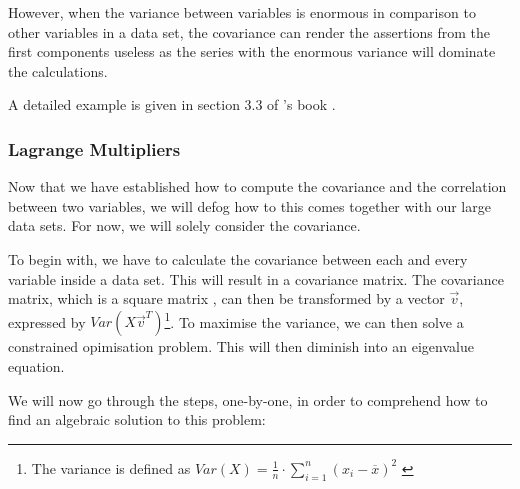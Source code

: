 However, when the variance between variables is enormous in comparison to other variables in a data set, the covariance can render the assertions from the first components useless as the series with the enormous variance will dominate the calculations.

A detailed example is given in section 3.3 of \citeauthor{brunton2019data}'s book  \cite{brunton2019data}.


\clearpage



\subsubsection{Lagrange Multipliers}

Now that we have established how to compute the covariance and the correlation between two variables, we will defog how to this comes together with our large data sets.
For now, we will solely consider the covariance.

To begin with, we have to calculate the covariance between each and every variable inside a data set.
This will result in a covariance matrix.
The covariance matrix, which is a square matrix \cite{PythonMachineLearningCh1}, can then be transformed by a vector $\overrightarrow{v}$, expressed by $Var(X\overrightarrow{v}^T)$\footnote{%
	The variance is defined as $Var(X) = \frac{1}{n} \cdot \displaystyle\sum_{i=1}^{n} (x_i - \overline{x})^2$ \cite{deisenroth2020mathematics}
}.
To maximise the variance, we can then solve a constrained opimisation problem.
This will then diminish into an eigenvalue equation.
\bigskip


We will now go through the steps, one-by-one, in order to comprehend how to find an algebraic solution to this problem:


